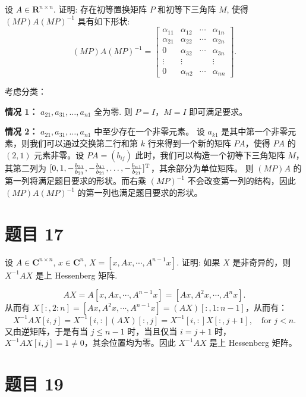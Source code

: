 \documentclass{article}
\begin{document}
设 $A \in \mathbf{R}^{n \times n}$. 证明: 存在初等置换矩阵 $P$ 和初等下三角阵 $M$, 使得
$(MP)A(MP)^{-1}$ 具有如下形状:
\[
  (MP)A(MP)^{-1} =
  \begin{bmatrix}
    \alpha_{11} & \alpha_{12} & \cdots & \alpha_{1n} \\
    \alpha_{21} & \alpha_{22} & \cdots & \alpha_{2n} \\
    0 & \alpha_{32} & \cdots & \alpha_{3n} \\
    \vdots & \vdots & & \vdots \\
    0 & \alpha_{n2} & \cdots & \alpha_{nn}
  \end{bmatrix}.
\]

\begin{solution}
  考虑分类：

  \textbf{情况 1：} $a_{21}, a_{31}, \ldots, a_{n1}$ 全为零. 则 $P = I$，$M = I$ 即可满足要求。

  \textbf{情况 2：} $a_{21}, a_{31}, \ldots, a_{n1}$ 中至少存在一个非零元素。 设
  $a_{k1}$ 是其中第一个非零元素，则我们可以通过交换第二行和第 $k$ 行来得到一个新的矩阵 $PA$，使得 $PA$ 的
  $(2, 1)$ 元素非零。设 $PA = (b_{ij})$ 此时，我们可以构造一个初等下三角矩阵
  $M$，其第二列为 $[0, 1, -\frac{b_{31}}{b_{21}}, -\frac{b_{41}}{b_{21}},
  \ldots, -\frac{b_{n1}}{b_{21}}]^{\mathrm{T}}$，其余部分为单位矩阵。 则 $(MP)A$
  的第一列将满足题目要求的形状。而右乘 $(MP)^{-1}$ 不会改变第一列的结构，因此 $(MP)A(MP)^{-1}$ 的第一列也满足题目要求的形状。
\end{solution}

\section{题目 17}

设 $A \in \mathbf{C}^{n \times n}$, $x \in \mathbf{C}^n$, $X = [x, Ax,
\cdots, A^{n-1}x]$. 证明: 如果 $X$ 是非奇异的，则 $X^{-1}AX$ 是上 Hessenberg 矩阵.

\begin{solution}
  \[
    AX = A[x, Ax, \cdots, A^{n-1}x] = [Ax, A^2x, \cdots, A^nx].
  \]
  从而有 $X[:, 2:n] = [Ax, A^2x, \cdots, A^{n-1}x] = (AX)[:, 1:n-1]$，从而有：
  \[
    X^{-1}AX[i,j] = X^{-1}[i,:] (AX)[:, j] = X^{-1}[i,:]X[:,j+1],
    \quad \text{for } j < n.
  \]
  又由逆矩阵，于是有当 $j \le n-1$ 时，当且仅当 $i = j+1$ 时，$X^{-1}AX[i,j] = 1 \neq
  0$，其余位置均为零。因此 $X^{-1}AX$ 是上 Hessenberg 矩阵。
\end{solution}

\section{题目 19}
\end{document}

